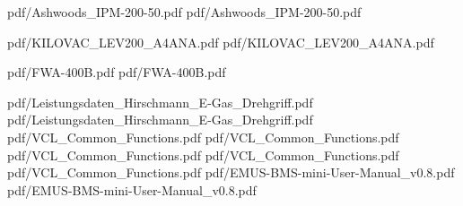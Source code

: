  {pdf/Ashwoods_IPM-200-50.pdf}
 {pdf/Ashwoods_IPM-200-50.pdf}

 {pdf/KILOVAC_LEV200_A4ANA.pdf}
 {pdf/KILOVAC_LEV200_A4ANA.pdf}

 {pdf/FWA-400B.pdf}
 {pdf/FWA-400B.pdf}

 {pdf/Leistungsdaten_Hirschmann_E-Gas_Drehgriff.pdf}
 {pdf/Leistungsdaten_Hirschmann_E-Gas_Drehgriff.pdf}
 {pdf/VCL_Common_Functions.pdf}
 {pdf/VCL_Common_Functions.pdf}
 {pdf/VCL_Common_Functions.pdf}
 {pdf/VCL_Common_Functions.pdf}
 {pdf/VCL_Common_Functions.pdf}
 {pdf/EMUS-BMS-mini-User-Manual_v0.8.pdf}
 {pdf/EMUS-BMS-mini-User-Manual_v0.8.pdf}

